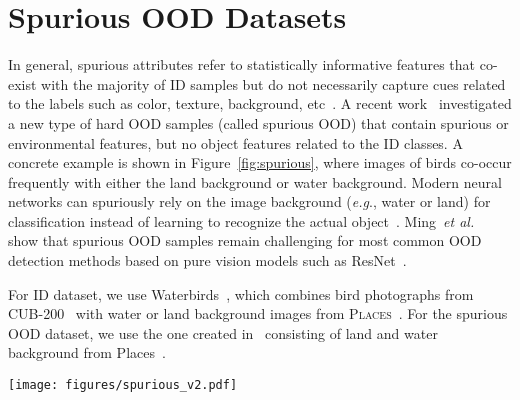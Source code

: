 \documentclass{article}
\def\eg{\emph{e.g}., }
\begin{document}
\section{Spurious OOD Datasets}
\label{sec:spurious}
In general, spurious attributes refer to statistically informative features that co-exist with the majority of ID samples but do not necessarily capture cues related to the labels such as color, texture, background, etc~\cite{ barbu2019objectnet,beery2018recognition,geirhos2018imagenettrained, xiao2021noise,ijcai2017zhu}.
A recent work~\cite{ming2022spurious} investigated a new type of hard OOD samples (called spurious OOD) that contain spurious or environmental features, but no object features related to the ID classes. A concrete example is shown in Figure~\ref{fig:spurious}, where images of birds co-occur frequently with either the land background or water background. Modern neural networks can spuriously rely on the image background (\eg water or land) for classification instead of learning to recognize the actual object~\cite{ribeiro2016should}. Ming~\emph{et al.}~\cite{ming2022spurious} show that spurious OOD samples remain challenging for most common OOD detection methods based on pure vision models such as ResNet~\cite{he2016deep}. 

For ID dataset, we use Waterbirds~\cite{sagawa2019distributionally}, which combines bird photographs from \textsc{CUB-200}~\cite{WahCUB_200_2011}
with water or land background images from \textsc{Places}~\cite{zhou2017places}. For the spurious OOD dataset, we use the one created in~\cite{ming2022spurious} consisting of land and water background from Places~\cite{zhou2017places}.

\begin{figure*}[thb]
  \centering
    \texttt{[image: figures/spurious\_v2.pdf]}
\caption{\small Illustration of spurious OOD samples for Waterbirds~\cite{sagawa2019distributionally}. Images are taken from~\cite{ming2022spurious}.}
\label{fig:spurious}
\end{figure*}
\end{document}
